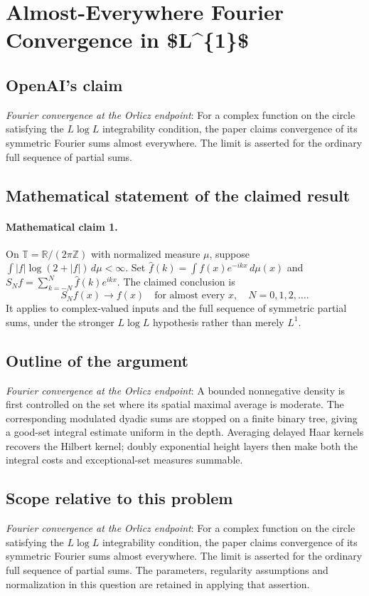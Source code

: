 \documentclass[11pt]{article}
\begin{document}
\section*{Almost-Everywhere Fourier Convergence in \$L\textasciicircum{}\{1\}\$}

\subsection{OpenAI's claim}
\textit{Fourier convergence at the Orlicz endpoint}: For a complex function on the circle satisfying the $L\log L$ integrability condition, the paper claims convergence of its symmetric Fourier sums almost everywhere. The limit is asserted for the ordinary full sequence of partial sums.

\subsection{Mathematical statement of the claimed result}
\paragraph{Mathematical claim 1.} On $\mathbb T=\mathbb R/(2\pi\mathbb Z)$ with normalized measure $\mu$, suppose $\int|f|\log(2+|f|)\,d\mu<\infty$. Set $\widehat f(k)=\int f(x)e^{-ikx}\,d\mu(x)$ and $S_Nf=\sum_{k=-N}^N\widehat f(k)e^{ikx}$. The claimed conclusion is \[S_Nf(x)\longrightarrow f(x)\quad\text{for almost every }x,\quad N=0,1,2,\ldots.\] It applies to complex-valued inputs and the full sequence of symmetric partial sums, under the stronger $L\log L$ hypothesis rather than merely $L^1$.

\subsection{Outline of the argument}
\textit{Fourier convergence at the Orlicz endpoint}: A bounded nonnegative density is first controlled on the set where its spatial maximal average is moderate. The corresponding modulated dyadic sums are stopped on a finite binary tree, giving a good-set integral estimate uniform in the depth. Averaging delayed Haar kernels recovers the Hilbert kernel; doubly exponential height layers then make both the integral costs and exceptional-set measures summable.

\subsection{Scope relative to this problem}
\textit{Fourier convergence at the Orlicz endpoint}: For a complex function on the circle satisfying the $L\log L$ integrability condition, the paper claims convergence of its symmetric Fourier sums almost everywhere. The limit is asserted for the ordinary full sequence of partial sums. The parameters, regularity assumptions and normalization in this question are retained in applying that assertion.
\end{document}
